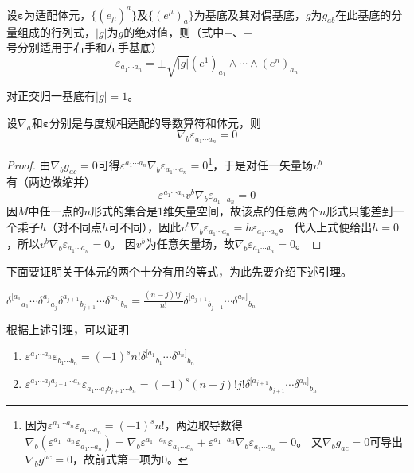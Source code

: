 \begin{theorem}
    设$\bm\varepsilon$为适配体元，$\{(e_\mu)^a\}$及$\{(e^\mu)_a\}$为基底及其对偶基底，$g$为$g_{ab}$在此基底的分量组成的行列式，$|g|$为$g$的绝对值，则（式中$+$、$-$号分别适用于右手和左手基底）
    $$\varepsilon_{a_1 \cdots a_n} = \pm\sqrt{|g|}(e^1)_{a_1} \wedge \cdots \wedge (e^n)_{a_n}$$
\end{theorem}

\begin{note}
    对正交归一基底有$|g| = 1$。
\end{note}

\begin{theorem}
    设$\nabla_a$和$\bm\varepsilon$分别是与度规相适配的导数算符和体元，则
    $$\nabla_b\varepsilon_{a_1 \cdots a_n} = 0$$
\end{theorem}

\begin{proof}
    由$\nabla_bg_{ac} = 0$可得$\varepsilon^{a_1 \cdots a_n}\nabla_b\varepsilon_{a_1 \cdots a_n} = 0$\footnote{
        因为$\varepsilon^{a_1 \cdots a_n}\varepsilon_{a_1 \cdots a_n} = (-1)^sn!$，两边取导数得$\nabla_b(\varepsilon^{a_1 \cdots a_n}\varepsilon_{a_1 \cdots a_n}) = \nabla_b\varepsilon^{a_1 \cdots a_n}\varepsilon_{a_1 \cdots a_n} + \varepsilon^{a_1 \cdots a_n}\nabla_b\varepsilon_{a_1 \cdots a_n} = 0$。
        又$\nabla_bg_{ac} = 0$可导出$\nabla_bg^{ac} = 0$，故前式第一项为0。
    }，于是对任一矢量场$v^b$有（两边做缩并）
    $$\varepsilon^{a_1 \cdots a_n}v^b\nabla_b\varepsilon_{a_1 \cdots a_n} = 0$$
    因$M$中任一点的$n$形式的集合是$1$维矢量空间，故该点的任意两个$n$形式只能差到一个乘子$h$（对不同点$h$可不同），因此$v^b\nabla_b\varepsilon_{a_1 \cdots a_n} = h\varepsilon_{a_1 \cdots a_n}$。
    代入上式便给出$h = 0$，所以$v^b\nabla_b\varepsilon_{a_1 \cdots a_n} = 0$。
    因$v^b$为任意矢量场，故$\nabla_b\varepsilon_{a_1 \cdots a_n} = 0$。
\end{proof}

下面要证明关于体元的两个十分有用的等式，为此先要介绍下述引理。

\begin{theorem}
    $\delta^{[a_1}{}_{a_1} \cdots \delta^{a_j}{}_{a_j}\delta^{a_{j + 1}}{}_{b_{j + 1}} \cdots \delta^{a_n]}{}_{b_n} = \displaystyle\frac{(n - j)!j!}{n!}\delta^{[a_{j + 1}}{}_{b_{j + 1}} \cdots \delta^{a_n]}{}_{b_n}$
\end{theorem}

根据上述引理，可以证明

\begin{theorem}
    \begin{enumerate}[（a）]
        \item $\varepsilon^{a_1 \cdots a_n}\varepsilon_{b_1 \cdots b_n} = (-1)^sn!\delta^{[a_1}{}_{b_1} \cdots \delta^{a_n]}{}_{b_n}$
        \item $\varepsilon^{a_1 \cdots a_j a_{j + 1} \cdots a_n}\varepsilon_{a_1 \cdots a_j b_{j + 1} \cdots b_n} = (-1)^s(n - j)!j!\delta^{[a_{j + 1}}{}_{b_{j + 1}} \cdots \delta^{a_n]}{}_{b_n}$
    \end{enumerate}
\end{theorem}


